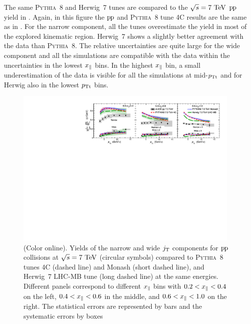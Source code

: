 The same \textsc{Pythia}~8 and Herwig~7 tunes are compared to the $\sqrt{s} = 7~\mathrm{TeV}$ $\mbox{p\kern-0.05em p}$ yield in . Again, in this figure the $\mbox{p\kern-0.05em p}$ and \textsc{Pythia}~8 tune 4C results are the same as in . For the narrow component, all the tunes overestimate the yield in most of the explored kinematic region. Herwig~7 shows a slightly better agreement with the data than \textsc{Pythia}~8. The relative uncertainties are quite large for the wide component and all the simulations are compatible with the data within the uncertainties in the lowest $x_{\parallel}$ bins. In the highest $x_{\parallel}$ bin, a small underestimation of the data is visible for all the simulations at mid-$p_{\rm Tt}$ and for Herwig also in the lowest $p_{\rm Tt}$ bins. 
  
  \begin{figure}[t]
    \begin{center}
      \includegraphics[width = 0.98\textwidth]{figures/results/jt_yield_finalFormComparisonUniformTextSize}
    \end{center}
    \caption{(Color online). Yields of the narrow and wide $j_{\rm T}$ components for $\mbox{p\kern-0.05em p}$ collisions at $\sqrt{s} = 7~\mathrm{TeV}$ (circular symbols) compared to \textsc{Pythia}~8 tunes 4C (dashed line) and Monash (short dashed line), and Herwig~7 LHC-MB tune (long dashed line) at the same energies. Different panels correspond to different $x_{\parallel}$ bins with $0.2 < x_{\parallel} < 0.4$ on the left, $0.4 < x_{\parallel} < 0.6$ in the middle, and $0.6 < x_{\parallel} < 1.0$ on the right. The statistical errors are represented by bars and the systematic errors by boxes}
    \label{fig:jtyieldMcComparison}
  \end{figure}
  
